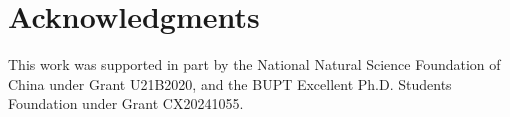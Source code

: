 \section*{Acknowledgments}
This work was supported in part by the National Natural Science Foundation of China under Grant U21B2020, and the BUPT Excellent Ph.D. Students Foundation under Grant CX20241055.